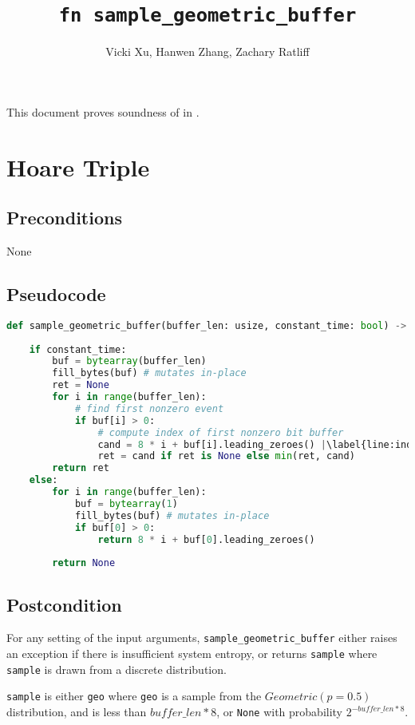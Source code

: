 \documentclass{article}
\title{\texttt{fn sample\_geometric\_buffer}}
\author{Vicki Xu, Hanwen Zhang, Zachary Ratliff}
\begin{document}
\maketitle

This document proves soundness of  in .

\section{Hoare Triple}
\subsection*{Preconditions}
None

\subsection*{Pseudocode}
\begin{lstlisting}[language=Python, escapechar=|]
def sample_geometric_buffer(buffer_len: usize, constant_time: bool) -> Optional[uint]: |\label{line:geombuffer}|
    
    if constant_time: 
        buf = bytearray(buffer_len)
        fill_bytes(buf) # mutates in-place
        ret = None
        for i in range(buffer_len):
            # find first nonzero event
            if buf[i] > 0:
                # compute index of first nonzero bit buffer
                cand = 8 * i + buf[i].leading_zeroes() |\label{line:indexcmp}|
                ret = cand if ret is None else min(ret, cand)
        return ret
    else:
        for i in range(buffer_len):
            buf = bytearray(1)
            fill_bytes(buf) # mutates in-place
            if buf[0] > 0:
                return 8 * i + buf[0].leading_zeroes()
        
        return None
\end{lstlisting}

\subsection*{Postcondition}
For any setting of the input arguments, \texttt{sample\_geometric\_buffer} either
raises an exception if there is insufficient system entropy, 
or returns \texttt{sample} where \texttt{sample} is drawn from a discrete distribution.

\texttt{sample} is either 
\texttt{geo} where \texttt{geo} is a sample from the $Geometric(p=0.5)$ distribution, and is less than $buffer\_len * 8$, or
\texttt{None} with probability $2^{-buffer\_len * 8}$.
\end{document}
